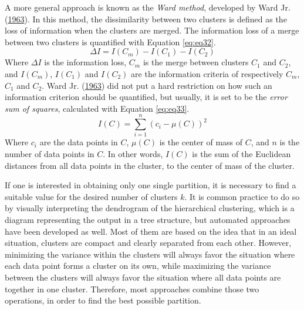 \documentclass[12pt,oneside]{reedthesis}
\begin{document}
A more general approach is known as the \emph{Ward method}, developed by
Ward Jr. (\protect\hyperlink{ref-ward1963}{1963}). In this method, the
dissimilarity between two clusters is defined as the loss of information
when the clusters are merged. The information loss of a merge between
two clusters is quantified with Equation \eqref{eq:eq32}.
\begin{equation}
\Delta I = I(C_{m}) - I(C_{1}) - I(C_{2})
\label{eq:eq32}
\end{equation}
Where \(\Delta I\) is the information loss, \(C_{m}\) is the merge
between clusters \(C_{1}\) and \(C_{2}\), and \(I(C_{m})\), \(I(C_{1})\)
and \(I(C_{2})\) are the information criteria of respectively \(C_{m}\),
\(C_{1}\) and \(C_{2}\). Ward Jr.
(\protect\hyperlink{ref-ward1963}{1963}) did not put a hard restriction
on how such an information criterion should be quantified, but usually,
it is set to be the \emph{error sum of squares}, calculated with
Equation \eqref{eq:eq33}.
\begin{equation}
I(C) = \sum_{i = 1}^{n} (c_{i} - \mu(C))^{2}
\label{eq:eq33}
\end{equation}
Where \(c_{i}\) are the data points in \(C\), \(\mu(C)\) is the center
of mass of \(C\), and \(n\) is the number of data points in \(C\). In
other words, \(I(C)\) is the sum of the Euclidean distances from all
data points in the cluster, to the center of mass of the cluster.

If one is interested in obtaining only one single partition, it is
necessary to find a suitable value for the desired number of clusters
\(k\). It is common practice to do so by visually interpreting the
dendrogram of the hierarchical clustering, which is a diagram
representing the output in a tree structure, but automated approaches
have been developed as well. Most of them are based on the idea that in
an ideal situation, clusters are compact and clearly separated from each
other. However, minimizing the variance within the clusters will always
favor the situation where each data point forms a cluster on its own,
while maximizing the variance between the clusters will always favor the
situation where all data points are together in one cluster. Therefore,
most approaches combine those two operations, in order to find the best
possible partition.
\end{document}
